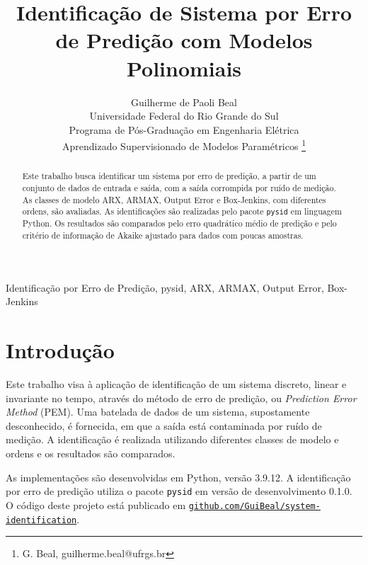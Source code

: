 \documentclass{ppgeesa}
\begin{document}

\title{Identificação de Sistema por Erro de Predição com Modelos Polinomiais}
\author{Guilherme de Paoli Beal
  \\
  {\small Universidade Federal do Rio Grande do Sul
  \\
  Programa de Pós-Graduação em Engenharia Elétrica
  \\
  Aprendizado Supervisionado de Modelos Paramétricos}
  \thanks{G. Beal, guilherme.beal@ufrgs.br}
}
\maketitle
\thispagestyle{empty}\pagestyle{empty}

\begin{abstract}
  Este trabalho busca identificar um sistema por erro de predição, a partir de um conjunto de dados de entrada e saída, com a saída corrompida por ruído de medição.
  As classes de modelo ARX, ARMAX, Output Error e Box-Jenkins, com diferentes ordens, são avaliadas.
  As identificações são realizadas pelo pacote \texttt{pysid} em linguagem Python.
  Os resultados são comparados pelo erro quadrático médio de predição e pelo critério de informação de Akaike ajustado para dados com poucas amostras.
\end{abstract}

\begin{IEEEkeywords}
  Identificação por Erro de Predição, pysid, ARX, ARMAX, Output Error, Box-Jenkins
\end{IEEEkeywords}

\section{Introdução}

Este trabalho visa à aplicação de identificação de um sistema discreto, linear e invariante no tempo, através do método de erro de predição, ou \emph{Prediction Error Method} (PEM).
Uma batelada de dados de um sistema, supostamente desconhecido, é fornecida, em que a saída está contaminada por ruído de medição.
A identificação é realizada utilizando diferentes classes de modelo e ordens e os resultados são comparados.

As implementações são desenvolvidas em Python, versão 3.9.12.
A identificação por erro de predição utiliza o pacote \texttt{pysid} em versão de desenvolvimento 0.1.0.
O código deste projeto está publicado em \href{https://github.com/GuiBeal/system-identification}{\texttt{github.com/GuiBeal/system-identification}}.
\end{document}
